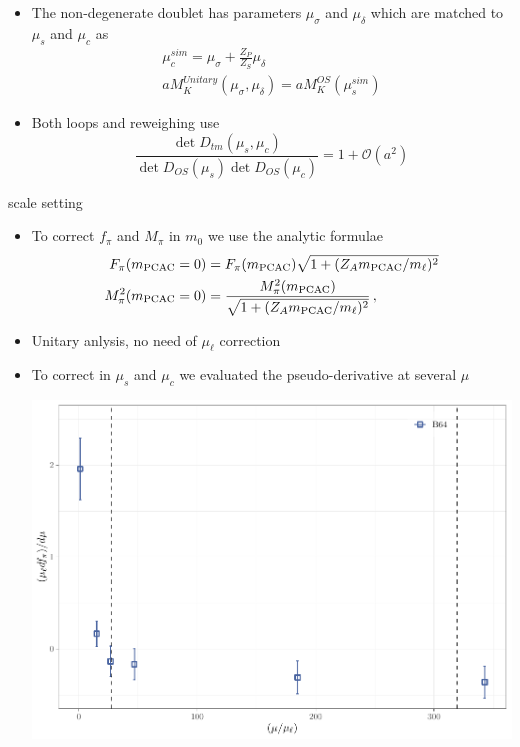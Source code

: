 \documentclass[xcolor={dvipsnames,table}]{beamer}
\begin{document}
\begin{frame}
  \begin{itemize}
    \item The non-degenerate doublet has  parameters $\mu_\sigma$ and $\mu_\delta$ which are matched
          to $\mu_s$ and $\mu_c$ as
          \begin{gather*}
            \mu_c^{sim} = \mu_\sigma + \frac{Z_P}{Z_S} \mu_\delta \\
            aM_K^{Unitary}(\mu_\sigma,\mu_\delta) = aM_K^{OS}(\mu_s^{sim})
          \end{gather*}
    \item<2-> Both loops and reweighing use
      $$
        \frac{\det{D_{tm}(\mu_s,\mu_c)}}{\det{D_{OS}(\mu_s)\det{D_{OS}(\mu_c)}}} = 1 + \mathcal{O}(a^2)
      $$
  \end{itemize}
\end{frame}


\begin{frame}{scale setting}
  \begin{itemize}
    \item To correct $f_\pi$ and $M_\pi$ in $m_0$ we use the analytic formulae
          \begin{align*}
            F_{\pi}(m_{\rm PCAC}=0)   & =F_{\pi}(m_{\rm PCAC})\sqrt{1+(Z_A m_{\rm PCAC}/ m_\ell)^2}               \\
            M_{\pi}^2(m_{\rm PCAC}=0) & = \frac{M_{\pi}^2(m_{\rm PCAC})}{\sqrt{1+(Z_A m_{\rm PCAC}/m_\ell)^2}}\,,
          \end{align*}
    \item<2-> Unitary anlysis, no need of $\mu_\ell$ correction
    \item<3->  To correct in $\mu_s$ and $\mu_c$ we evaluated the pseudo-derivative at several $\mu$
      \begin{center}
        \includegraphics[scale=0.5]{plots/der_fpi_B64.pdf}
      \end{center}
  \end{itemize}
\end{frame}
\end{document}
